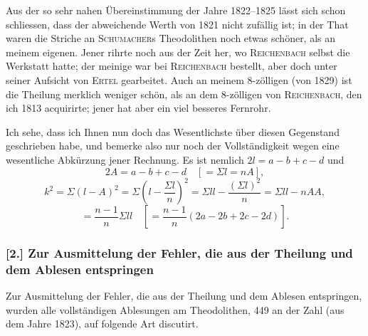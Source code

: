 \documentclass[12pt,a4paper]{article}
\theoremstyle{plain}
\theoremstyle{definition}
\theoremstyle{remark}
\begin{document}
Aus der so sehr nahen \"Ubereinstimmung der Jahre 1822--1825 l\"asst sich schon schliessen, dass der abweichende Werth von 1821 nicht zuf\"allig ist; in der That waren die Striche an \textsc{Schumacher}s Theodolithen noch etwas sch\"oner, als an meinem eigenen. Jener rihrte noch aus der Zeit her, wo \textsc{Reichenbach} selbst die Werkstatt hatte; der meinige war bei \textsc{Reichenbach} bestellt, aber doch unter seiner Aufsicht von \textsc{Ertel} gearbeitet. Auch an meinem 8-z\"olligen (von 1829) ist die Theilung merklich weniger sch\"on, als an dem 8-z\"olligen von \textsc{Reichenbach}, den ich 1813 acquirirte; jener hat aber ein viel besseres Fernrohr.

Ich sehe, dass ich Ihnen nun doch das Wesentlichste \"uber diesen Gegenstand geschrieben habe, und bemerke also nur noch der Vollst\"andigkeit wegen eine wesentliche Abk\"urzung jener Rechnung. Es ist nemlich $2l = a - b + c - d$ und
\[
2A = a - b + c - d \quad [= \Sigma l = nA],
\]
\[
k^2 = \Sigma(l-A)^2 = \Sigma\!\left(l - \frac{\Sigma l}{n}\right)^{\!2}
= \Sigma ll - \frac{(\Sigma l)^2}{n} = \Sigma ll - nAA,
\]
\[
= \frac{n-1}{n}\Sigma ll \quad [= \frac{n-1}{n}(2a - 2b + 2c - 2d)].
\]

\subsubsection*{[2.] Zur Ausmittelung der Fehler, die aus der Theilung und dem Ablesen entspringen}

Zur Ausmittelung der Fehler, die aus der Theilung und dem Ablesen entspringen, wurden alle vollst\"andigen Ablesungen am Theodolithen, 449 an der Zahl (aus dem Jahre 1823), auf folgende Art discutirt.

\vfill
\eject
\end{document}
